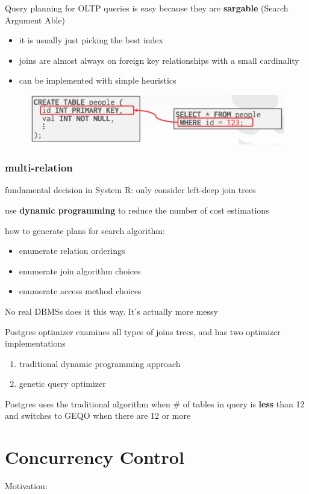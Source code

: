 \documentclass[11pt]{article}
\begin{document}
Query planning for OLTP queries is easy because they are \textbf{sargable} (Search Argument Able)
\begin{itemize}
\item it is usually just picking the best index
\item joins are almost always on foreign key relationships with a small cardinality
\item can be implemented with simple heuristics
\end{itemize}
\begin{figure}[htbp]
\centering
\includegraphics[width=.8\textwidth]{../images/15445/46.png}
\label{}
\end{figure}
\subsubsection{multi-relation}
\label{sec:org96c7dff}
fundamental decision in System R: only consider left-deep join trees

use \textbf{dynamic programming} to reduce the number of cost estimations

how to generate plans for search algorithm:
\begin{itemize}
\item enumerate relation orderings
\item enumerate join algorithm choices
\item enumerate access method choices
\end{itemize}

No real DBMSs does it this way. It's actually more messy

Postgres optimizer examines all types of joins trees, and has two optimizer implementations
\begin{enumerate}
\item traditional dynamic programming approach
\item genetic query optimizer
\end{enumerate}

Postgres uses the traditional algorithm when \# of tables in query is \textbf{less} than 12 and switches
to GEQO when there are 12 or more
\section{Concurrency Control}
\label{sec:org0fb04a7}
Motivation:
\end{document}
